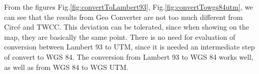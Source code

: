 \begin{figure}[!htbp]
\end{figure}


\begin{figure}[!htbp]
\end{figure}

From the figures Fig.\ref{fig:convertToLambert93}, Fig.\ref{fig:convertTowgs84utm}, we can see that the results from Geo Converter are not too much different from Circ\'e and TWCC. This deviation can be tolerated, since when showing on the map, they are basically the same point.
There is no need for evaluation of conversion between Lambert 93 to UTM, since it is needed an intermediate step of convert to WGS 84. The conversion from Lambert 93 to WGS 84 works well, as well as from WGS 84 to WGS UTM. 



